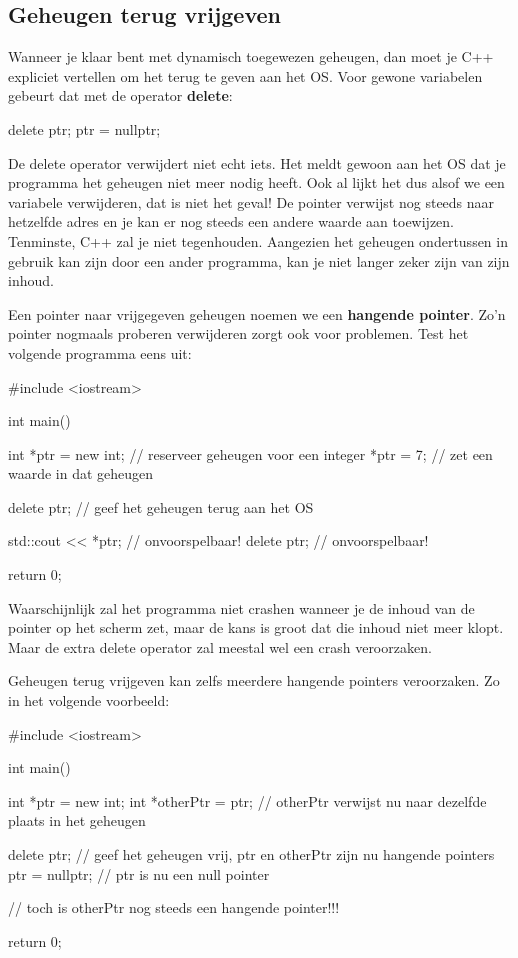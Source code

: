 \documentclass[11pt, oldfontcommands, oneside, a4paper]{memoir}
\begin{document}
\subsection{Geheugen terug vrijgeven}

Wanneer je klaar bent met dynamisch toegewezen geheugen, dan moet je C++ expliciet vertellen om het terug te geven aan het OS. Voor gewone variabelen gebeurt dat met de operator \textbf{delete}:

\begin{code}
delete ptr;
ptr = nullptr;
\end{code}

De delete operator verwijdert niet echt iets. Het meldt gewoon aan het OS dat je programma het geheugen niet meer nodig heeft. Ook al lijkt het dus alsof we een variabele verwijderen, dat is niet het geval! De pointer verwijst nog steeds naar hetzelfde adres en je kan er nog steeds een andere waarde aan toewijzen. Tenminste, C++ zal je niet tegenhouden. Aangezien het geheugen ondertussen in gebruik kan zijn door een ander programma, kan je niet langer zeker zijn van zijn inhoud.

Een pointer naar vrijgegeven geheugen noemen we een \textbf{hangende pointer}. Zo'n pointer nogmaals proberen verwijderen zorgt ook voor problemen. Test het volgende programma eens uit:

\begin{code}
#include <iostream>
 
int main()
{
    int *ptr = new int; // reserveer geheugen voor een integer
    *ptr = 7; // zet een waarde in dat geheugen
 
    delete ptr; // geef het geheugen terug aan het OS
 
    std::cout << *ptr; // onvoorspelbaar!
    delete ptr; // onvoorspelbaar!
 
    return 0;
}
\end{code}

Waarschijnlijk zal het programma niet crashen wanneer je de inhoud van de pointer op het scherm zet, maar de kans is groot dat die inhoud niet meer klopt. Maar de extra delete operator zal meestal wel een crash veroorzaken.

Geheugen terug vrijgeven kan zelfs meerdere hangende pointers veroorzaken. Zo in het volgende voorbeeld:

\begin{code}
#include <iostream>
 
int main()
{
    int *ptr = new int; 
    int *otherPtr = ptr; // otherPtr verwijst nu naar dezelfde plaats in het geheugen
 
    delete ptr; // geef het geheugen vrij, ptr en otherPtr zijn nu hangende pointers
    ptr = nullptr; // ptr is nu een null pointer
 
    // toch is otherPtr nog steeds een hangende pointer!!!
 
    return 0;
}
\end{code}
\end{document}
